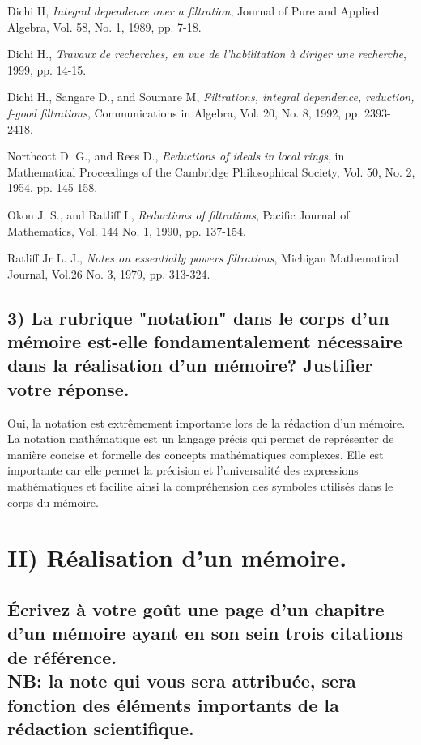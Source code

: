 \documentclass[12pt, a4paper, oneside]{book}
\begin{document}
	\begin{thebibliography}{99}
		
		 Dichi H,\textit{ Integral dependence over a filtration}, Journal of Pure and Applied Algebra, Vol. 58, No. 1, 1989, pp. 7-18. 
		
		 Dichi H., \textit{Travaux de recherches, en vue de l'habilitation à diriger une recherche}, 1999, pp. 14-15.	
		
		 Dichi H., Sangare D., and Soumare M,\textit{ Filtrations, integral dependence, reduction, f-good filtrations}, Communications in Algebra, Vol. 20, No. 8, 1992, pp. 2393-2418.
		
		 Northcott D. G., and Rees D.,\textit{ Reductions of ideals in local rings}, in Mathematical Proceedings of the Cambridge Philosophical Society, Vol. 50, No. 2, 1954, pp. 145-158.
		
		 Okon J. S., and Ratliff L,\textit{ Reductions of filtrations}, Pacific Journal of Mathematics, Vol. 144 No. 1, 1990, pp. 137-154.
		
		 Ratliff Jr L. J.,\textit{ Notes on essentially powers filtrations}, Michigan Mathematical Journal, Vol.26 No. 3, 1979, pp. 313-324.
		
	\end{thebibliography}
	
	
	\subsection*{3) La rubrique "notation" dans le corps d'un mémoire est-elle fondamentalement nécessaire dans la réalisation d'un mémoire? Justifier votre réponse.}
	
	Oui, la notation est extrêmement importante lors de la rédaction d'un mémoire. La notation mathématique est un langage précis qui permet de représenter de manière concise et formelle des concepts mathématiques complexes. Elle est importante car elle permet la précision et l'universalité des expressions mathématiques et facilite ainsi la compréhension des symboles utilisés dans le corps du mémoire.
	
	\section*{II) Réalisation d'un mémoire.}
	
	\subsection*{Écrivez à votre goût une page d'un chapitre d'un mémoire ayant en son sein trois citations de référence.\\ NB: la note qui vous sera attribuée, sera fonction des éléments importants de la rédaction scientifique.}
	
\end{document}
